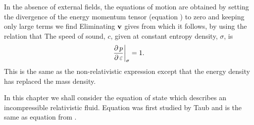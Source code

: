 In the absence of external fields, the equations of motion are obtained by setting the 
 divergence of the energy momentum tensor (equation ) to zero and keeping only large terms we find
Eliminating $\textbf{v}$ gives
from which it follows, by using the relation
that
The speed of sound, $c$,  given at constant entropy density, $\sigma$, is\cite{LandauBook,Taub1978} 
\begin{align}
   \left.{\frac{\operatorname{\partial} p}{\operatorname{\partial} \varepsilon}}\right|_{\sigma} = 1. \label{eqn:soundspeed}
\end{align}
This is the same as the non-relativistic expression except that the energy density has replaced the mass density.

In this chapter we shall consider the equation of state
which describes an incompressible relativistic fluid.
Equation  was first studied by Taub\cite{Taub1978}
and is the same as equation  from .

